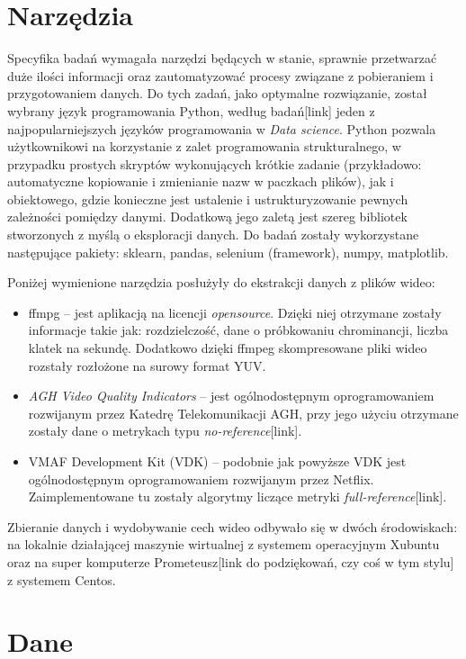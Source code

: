 \section{Narzędzia}
Specyfika badań wymagała narzędzi będących w stanie, sprawnie przetwarzać duże ilości informacji oraz zautomatyzować procesy związane z pobieraniem i przygotowaniem danych. Do tych zadań, jako optymalne rozwiązanie, został wybrany język programowania Python, według badań[link] jeden z najpopularniejszych języków programowania w {\em Data science}. Python pozwala użytkownikowi na korzystanie z zalet programowania strukturalnego, w przypadku prostych skryptów wykonujących krótkie zadanie (przykładowo: automatyczne kopiowanie i zmienianie nazw w paczkach plików), jak i obiektowego, gdzie konieczne jest ustalenie i ustrukturyzowanie pewnych zależności pomiędzy danymi. Dodatkową jego zaletą jest szereg bibliotek stworzonych z myślą o eksploracji danych. Do badań zostały wykorzystane następujące pakiety: sklearn, pandas, selenium (framework), numpy, matplotlib.\par\par
Poniżej wymienione narzędzia posłużyły do ekstrakcji danych z plików wideo:
\begin{itemize}[label=$\bullet$]
\item ffmpg -- jest aplikacją na licencji {\em opensource}. Dzięki niej otrzymane zostały informacje takie jak: rozdzielczość, dane o próbkowaniu chrominancji, liczba klatek na sekundę. Dodatkowo dzięki ffmpeg skompresowane pliki wideo rozstały rozłożone na surowy format YUV.
\item {\em AGH Video Quality Indicators} -- jest ogólnodostępnym oprogramowaniem rozwijanym przez Katedrę Telekomunikacji AGH, przy jego użyciu otrzymane zostały dane o metrykach typu {\em no-reference}[link].
\item VMAF Development Kit (VDK) -- podobnie jak powyższe VDK jest ogólnodostępnym oprogramowaniem rozwijanym przez Netflix. Zaimplementowane tu zostały algorytmy liczące metryki {\em full-reference}[link].
\end{itemize}
Zbieranie danych i wydobywanie cech wideo odbywało się w dwóch środowiskach: na lokalnie działającej maszynie wirtualnej z systemem operacyjnym Xubuntu oraz na super komputerze Prometeusz[link do podziękowań, czy coś w tym stylu] z systemem Centos. 

\label{cha:drugiDokument}



\section{Dane}
\label{cha:drugiDokument}

